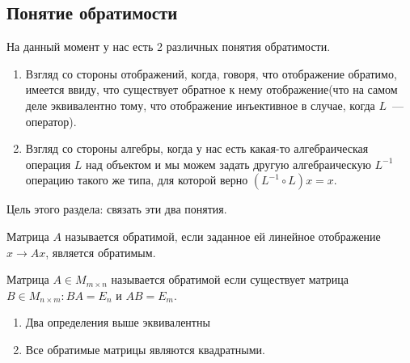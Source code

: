 \subsection{Понятие обратимости}
\begin{motivation}
    На данный момент у нас есть 2 различных понятия обратимости.
    \begin{enumerate}
        \item Взгляд со стороны отображений, когда, говоря, что отображение обратимо,
            имеется ввиду, что существует обратное к нему отображение(что на
            самом деле эквивалентно тому, что отображение инъективное в случае,
            когда $L$~--- оператор).
        \item Взгляд со стороны алгебры, когда у нас есть какая-то алгебраическая
            операция $L$ над объектом и мы можем задать другую алгебраическую $L^{-1}$
            операцию такого же типа, для которой верно $(L^{-1}\circ L)x = x$.
    \end{enumerate}
    Цель этого раздела: связать эти два понятия.
\end{motivation}
\begin{definition}
    Матрица $A$ называется обратимой, если заданное ей линейное отображение $x \rightarrow Ax$, 
    является обратимым.
\end{definition}
\begin{definition}
    Матрица $A\in M_{m\times n}$ называется обратимой если существует матрица 
    $B\in M_{n\times m}\colon BA = E_n \text{ и } AB = E_m$.
\end{definition}
\begin{statement}\leavevmode
    \begin{enumerate}
        \item Два определения выше эквивалентны
        \item Все обратимые матрицы являются квадратными.
    \end{enumerate}
\end{statement}
